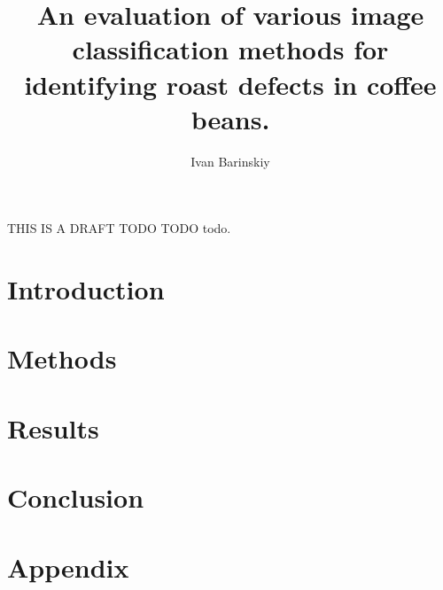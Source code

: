 \documentclass{./styles/UoYCSproject}
\author{Ivan Barinskiy}
\title{An evaluation of various image classification methods for identifying roast defects in coffee beans.}
\begin{document}
\maketitle
\listoffigures
\listoftables

\begin{summary}
THIS IS A DRAFT TODO TODO todo.
\end{summary}

\chapter{Introduction}
\label{ch:introduction}

\chapter{Methods}
\label{ch:methods2}

\chapter{Results}
\label{ch:results}

\chapter{Conclusion}
\label{ch:conclusion}


\appendix
\chapter{Appendix}
\label{ch:appendix}

\printbibliography
\end{document}
